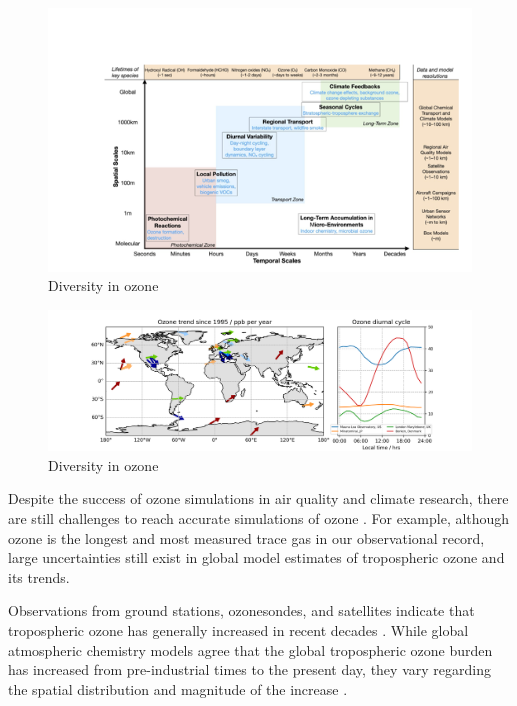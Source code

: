 \documentclass[gmd, manuscript]{copernicus}
\begin{document}
\begin{figure}
    \centering
    \includegraphics[width=1.05\linewidth]{figures/Figure0.png}
    \caption{Diversity in ozone}
    \label{fig:difficulties1}
\end{figure}
\begin{figure}
    \centering
    \includegraphics[width=1.05\linewidth]{figures/figure1.png}
    \caption{Diversity in ozone}
    \label{fig:difficulties2}
\end{figure}

Despite the success of ozone simulations in air quality and climate research, there are still challenges to reach accurate simulations of ozone \citep{young_tropospheric_2018}. For example, although ozone is the longest and most measured trace gas in our observational record, large uncertainties still exist in global model estimates of tropospheric ozone and its trends.

Observations from ground stations, ozonesondes, and satellites indicate that tropospheric ozone has generally increased in recent decades \citep{ziemke_trends_2019, young_tropospheric_2018, IPCC_2021_WGI_Ch_2}. While global atmospheric chemistry models agree that the global tropospheric ozone burden has increased from pre-industrial times to the present day, they vary regarding the spatial distribution and magnitude of the increase \citep{skeie_historical_2020, christiansen_multidecadal_2022, fiore_understanding_2022}.
\end{document}
